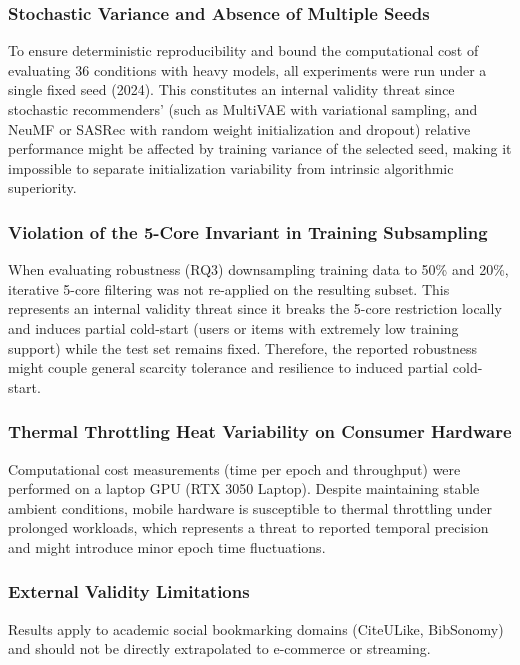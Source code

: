 \documentclass[journal]{IEEEtran}
\begin{document}
\subsubsection{Stochastic Variance and Absence of Multiple Seeds}
To ensure deterministic reproducibility and bound the computational cost of evaluating 36 conditions with heavy models, all experiments were run under a single fixed seed (2024). This constitutes an internal validity threat since stochastic recommenders' (such as MultiVAE with variational sampling, and NeuMF or SASRec with random weight initialization and dropout) relative performance might be affected by training variance of the selected seed, making it impossible to separate initialization variability from intrinsic algorithmic superiority.

\subsubsection{Violation of the 5-Core Invariant in Training Subsampling}
\label{subsec:ruptura-5core}
When evaluating robustness (RQ3) downsampling training data to 50\% and 20\%, iterative 5-core filtering was not re-applied on the resulting subset. This represents an internal validity threat since it breaks the 5-core restriction locally and induces partial cold-start (users or items with extremely low training support) while the test set remains fixed. Therefore, the reported robustness might couple general scarcity tolerance and resilience to induced partial cold-start.

\subsubsection{Thermal Throttling Heat Variability on Consumer Hardware}
Computational cost measurements (time per epoch and throughput) were performed on a laptop GPU (RTX 3050 Laptop). Despite maintaining stable ambient conditions, mobile hardware is susceptible to thermal throttling under prolonged workloads, which represents a threat to reported temporal precision and might introduce minor epoch time fluctuations.

\subsubsection{External Validity Limitations}
Results apply to academic social bookmarking domains (CiteULike, BibSonomy) and should not be directly extrapolated to e-commerce or streaming.
\end{document}
